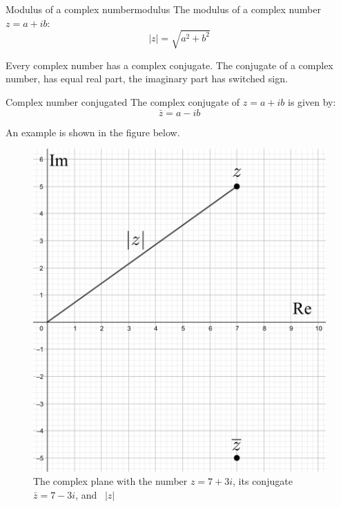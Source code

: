 \begin{definition}{Modulus of a complex number}{modulus}
The modulus of a complex number $z=a+ib$:
$$\mid z\mid=\sqrt{a^2+b^2}$$
\end{definition}
\noindent
Every complex number has a complex conjugate. The conjugate of a complex number, has equal real part, the imaginary part has switched sign.


\begin{definition}{Complex number conjugated}{}
The complex conjugate of $z=a+ib$ is given by:
$$\bar{z}=a-ib$$
\end{definition}
\noindent An example is shown in the figure below.  
\begin{figure}[H]
\centering
\includegraphics[scale=0.2]{fig/img/complex_plan}
\caption{The complex plane with the number $z=7+3i$, its conjugate $\bar{z}=7-3i$, and \  $|z|$}
\end{figure}



